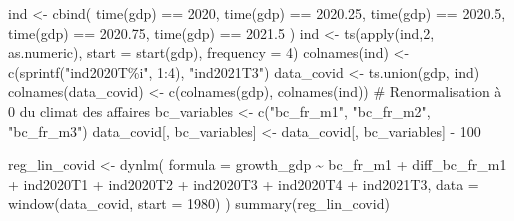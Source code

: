 \documentclass[
  a4paper,
  DIV=11,
  numbers=noendperiod,
  french]{scrartcl}
\newenvironment{Shaded}{\begin{snugshade}}{\end{snugshade}}
\newcommand{\AttributeTok}[1]{\textcolor[rgb]{0.40,0.45,0.13}{#1}}
\newcommand{\CommentTok}[1]{\textcolor[rgb]{0.37,0.37,0.37}{#1}}
\newcommand{\DecValTok}[1]{\textcolor[rgb]{0.68,0.00,0.00}{#1}}
\newcommand{\FloatTok}[1]{\textcolor[rgb]{0.68,0.00,0.00}{#1}}
\newcommand{\FunctionTok}[1]{\textcolor[rgb]{0.28,0.35,0.67}{#1}}
\newcommand{\NormalTok}[1]{\textcolor[rgb]{0.00,0.23,0.31}{#1}}
\newcommand{\OtherTok}[1]{\textcolor[rgb]{0.00,0.23,0.31}{#1}}
\newcommand{\SpecialCharTok}[1]{\textcolor[rgb]{0.37,0.37,0.37}{#1}}
\newcommand{\StringTok}[1]{\textcolor[rgb]{0.13,0.47,0.30}{#1}}
\newcommand\1{{\mathds 1}}
\theoremstyle{remark}
\begin{document}
\begin{Shaded}
\begin{Highlighting}[]
\NormalTok{ind }\OtherTok{\textless{}{-}} \FunctionTok{cbind}\NormalTok{(}
  \FunctionTok{time}\NormalTok{(gdp) }\SpecialCharTok{==} \DecValTok{2020}\NormalTok{, }\FunctionTok{time}\NormalTok{(gdp) }\SpecialCharTok{==} \FloatTok{2020.25}\NormalTok{, }
  \FunctionTok{time}\NormalTok{(gdp) }\SpecialCharTok{==} \FloatTok{2020.5}\NormalTok{, }\FunctionTok{time}\NormalTok{(gdp) }\SpecialCharTok{==} \FloatTok{2020.75}\NormalTok{,}
  \FunctionTok{time}\NormalTok{(gdp) }\SpecialCharTok{==} \FloatTok{2021.5}
\NormalTok{)}
\NormalTok{ind }\OtherTok{\textless{}{-}} \FunctionTok{ts}\NormalTok{(}\FunctionTok{apply}\NormalTok{(ind,}\DecValTok{2}\NormalTok{, as.numeric), }\AttributeTok{start =} \FunctionTok{start}\NormalTok{(gdp), }\AttributeTok{frequency =} \DecValTok{4}\NormalTok{)}
\FunctionTok{colnames}\NormalTok{(ind) }\OtherTok{\textless{}{-}} \FunctionTok{c}\NormalTok{(}\FunctionTok{sprintf}\NormalTok{(}\StringTok{"ind2020T\%i"}\NormalTok{, }\DecValTok{1}\SpecialCharTok{:}\DecValTok{4}\NormalTok{), }\StringTok{"ind2021T3"}\NormalTok{)}
\NormalTok{data\_covid }\OtherTok{\textless{}{-}} \FunctionTok{ts.union}\NormalTok{(gdp, ind)}
\FunctionTok{colnames}\NormalTok{(data\_covid) }\OtherTok{\textless{}{-}} \FunctionTok{c}\NormalTok{(}\FunctionTok{colnames}\NormalTok{(gdp), }\FunctionTok{colnames}\NormalTok{(ind))}
\CommentTok{\# Renormalisation à 0 du climat des affaires}
\NormalTok{bc\_variables }\OtherTok{\textless{}{-}} \FunctionTok{c}\NormalTok{(}\StringTok{"bc\_fr\_m1"}\NormalTok{, }\StringTok{"bc\_fr\_m2"}\NormalTok{, }\StringTok{"bc\_fr\_m3"}\NormalTok{)}
\NormalTok{data\_covid[, bc\_variables] }\OtherTok{\textless{}{-}}\NormalTok{ data\_covid[, bc\_variables] }\SpecialCharTok{{-}} \DecValTok{100}

\NormalTok{reg\_lin\_covid }\OtherTok{\textless{}{-}} \FunctionTok{dynlm}\NormalTok{(}
  \AttributeTok{formula =}\NormalTok{ growth\_gdp }\SpecialCharTok{\textasciitilde{}}\NormalTok{ bc\_fr\_m1 }\SpecialCharTok{+}\NormalTok{ diff\_bc\_fr\_m1 }\SpecialCharTok{+}
\NormalTok{    ind2020T1 }\SpecialCharTok{+}\NormalTok{ ind2020T2 }\SpecialCharTok{+}\NormalTok{ ind2020T3 }\SpecialCharTok{+}\NormalTok{ ind2020T4 }\SpecialCharTok{+} 
\NormalTok{    ind2021T3,}
  \AttributeTok{data =} \FunctionTok{window}\NormalTok{(data\_covid, }\AttributeTok{start =} \DecValTok{1980}\NormalTok{)}
\NormalTok{)}
\FunctionTok{summary}\NormalTok{(reg\_lin\_covid)}
\end{Highlighting}
\end{Shaded}
\end{document}
